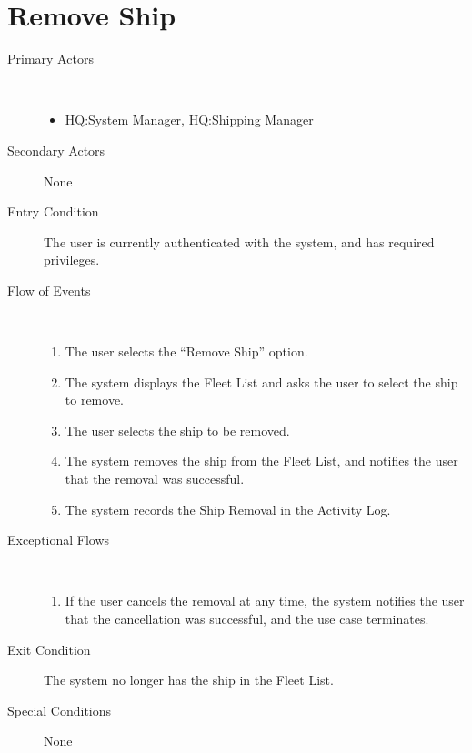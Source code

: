 \documentclass[a4paper,10pt]{report}
\begin{document}
\section{Remove Ship}
\begin{description}
\item[Primary Actors] \
  \begin{itemize}
  \item HQ:System Manager, HQ:Shipping Manager
  \end{itemize}
\item[Secondary Actors] None
\item[Entry Condition]
  The user is currently authenticated with the system, and has required privileges.
\item[Flow of Events] \
  \begin{enumerate}
  \item The user selects the ``Remove Ship'' option.
  \item The system displays the Fleet List and asks the user to select the ship to remove.
  \item The user selects the ship to be removed.
  \item The system removes the ship from the Fleet List, and notifies the user that the removal was successful.
    \item The system records the Ship Removal in the Activity Log.
  \end{enumerate}
\item[Exceptional Flows] \
  \begin{enumerate}
  \item If the user cancels the removal at any time, the system notifies the user that the cancellation was successful, and the use case terminates.
  \end{enumerate}
\item[Exit Condition]
  The system no longer has the ship in the Fleet List.
\item[Special Conditions] None
\end{description}
\end{document}
